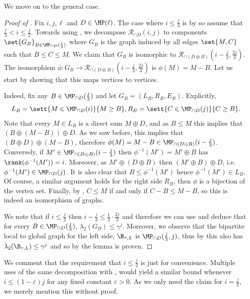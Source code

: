 We move on to the general case.
\begin{proof}[Proof of ]
    Fix \(i,j,\ell\) and \(D \in \MP(\ell)\). The case where \(i \leq \frac{j}{3}\) is by  so assume that \(\frac{j}{3} < i \leq \frac{j}{2}\). Towards using , we decompose \(\mathcal{R}_{\cap D}(i,j)\) to components \(\set{G_B}_{B \in \MP_{\cap D}(\frac{j}{3})}\) where \(G_B\) is the graph induced by all edges \(\set{M,C}\) such that \(B \leq C \leq M\). We claim that \(G_B\) is isomorphic to \(\mathcal{R}_{\cap (D \oplus B)}(i-\frac{j}{3},\frac{2j}{3})\). The isomorphism \(\phi: G_B \to \mathcal{R}_{\cap (D \oplus B)}(i-\frac{j}{3},\frac{2j}{3})\) is \(\phi(M) = M-B\). Let us start by showing that this maps vertices to vertices.

    Indeed, fix any \(B \in \MP_{\cap D}(\frac{j}{3})\) and let \(G_B=(L_B,R_B,E_B)\). Explicitly,
    \[L_{B} = \sett{M \in \MP_{\cap D}(i)}{M \geq B}, R_{B} = \sett{C \in \MP_{\cap D}(j)}{C \geq B}.\]
    Note that every \(M \in L_B\) is a direct sum \(M \oplus D\), and as \(B \leq M\) this implies that \((B \oplus (M-B)) \oplus D\). As we saw before, this implies that \((B \oplus D) \oplus (M-B)\), therefore \(\phi(M)=M-B \in \MP_{\cap (D \oplus B)}(i-\frac{j}{3})\). Conversely, if \(M' \in \MP_{\cap (D \oplus B)}(i-\frac{j}{3})\) then \(\phi^{-1}(M') = M' \oplus B\) has \(\rank(\phi^{-1}(M')) = i\). Moreover, as \(M' \oplus (D \oplus B)\) then \((M' \oplus B) \oplus D\), i.e. \(\phi^{-1}(M') \in \MP_{\cap D}(j)\). It is also clear that \(B \leq \phi^{-1}(M')\) hence \(\phi^{-1}(M') \in L_B\). Of course, a similar argument holds for the right side \(R_B\), then \(\phi\) is a bijection of the vertex set. Finally, by , \(C \leq M\) if and only if \(C-B \leq M-B\), so this is indeed an isomorphism of graphs.

    We note that if \(i \leq \frac{j}{2}\) then \(i-\frac{j}{3} \leq \frac{1}{2} \cdot \frac{2j}{3}\) and therefore we can use  and deduce that for every \(B \in \MP_{\cap D}(\frac{j}{3})\), \(\lambda_2(G_B) \leq \gamma^{j}\). Moreover, we observe that the bipartite local to global graph for the left side, \(\B_{\tau, L}\) is \(\MP_{\cap D}(\frac{j}{3},j)\), thus by  this also has \(\lambda_2(\B_{\tau, L}) \leq \gamma^{j}\) and so by  the lemma is proven.
\end{proof}
We comment that the requirement that \(i \leq \frac{j}{2}\) is just for convenience. Multiple uses of the same decomposition with , would yield a similar bound whenever \(i \leq (1-\varepsilon)j\) for any fixed constant \(\varepsilon > 0\). As we only need the claim for \(i=\frac{j}{2}\), we merely mention this without proof.

